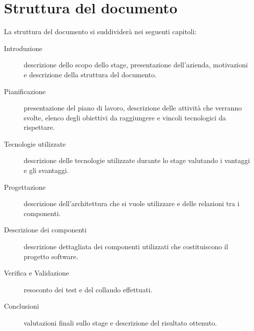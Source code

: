 \section{Struttura del documento}
La struttura del documento si suddividerà nei seguenti capitoli:
\begin{description}
	\item [Introduzione] descrizione dello scopo dello stage, presentazione dell'azienda, motivazioni e descrizione della struttura del documento.
	\item [Pianificazione] presentazione del piano di lavoro, descrizione delle attività che verranno svolte, elenco degli obiettivi da raggiungere e vincoli tecnologici da rispettare.
	\item [Tecnologie utilizzate] descrizione delle tecnologie utilizzate durante lo stage valutando i vantaggi e gli svantaggi.
	\item [Progettazione] descrizione dell'architettura che si vuole utilizzare e delle relazioni tra i componenti.
	\item [Descrizione dei componenti] descrizione dettagliata dei componenti utilizzati che costituiscono il progetto software.
	\item [Verifica e Validazione] resoconto dei test e del collaudo effettuati.
	\item [Conclusioni] valutazioni finali sullo stage e descrizione del risultato ottenuto.
\end{description}
 